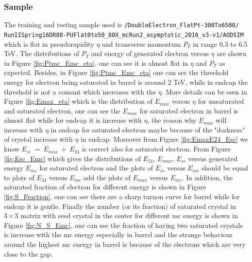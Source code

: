 \subsubsection{Sample}
The training and testing sample used is \texttt{/DoubleElectron\_FlatPt-300To6500/\\RunIISpring16DR80-PUFlat0to50\_80X\_mcRun2\_asymptotic\_2016\_v3-v1/AODSIM} \\ which is flat in pseudorapidity $\eta$ and transverse momentum $P_{T}$ in range 0.3 to 6.5 TeV. The distributions of $P_{T}$ and energy of generated electron versus $\eta$ are shown in Figure \ref{fig:Ptmc_Emc_eta}, one can see it is almost flat in $\eta$ and $P_{T}$ as expected. Besides, in Figure \ref{fig:Ptmc_Emc_eta} one can see the threshold energy for electron being saturated in barrel is around 2 TeV, while in endcap the threshold is not a consant which increases with the $\eta$. More details can be seen in Figure \ref{fig:Emax_eta} which is the distribution of $E_{max}$ versus $\eta$ for unsaturated and saturated electron, one can see the $E_{max}$ for saturated electron in barrel is almost flat while for endcap it is increase with $\eta$, the reason why $E_{max}$ will increase with $\eta$ in endcap for saturated electron maybe because of the "darkness" of crystal increase with $\eta$ in endcap.
Moreover from Figure \ref{fig:EmaxE24_Esc} we know $E_{sc}~ = ~E_{max}~+~E_{24}$ is correct also for saturated electron. From Figure \ref{fig:Esc_Emc} which gives the distributions of $E_{24}$, $E_{max}$, $E_{sc}$ versus generated energy $E_{mc}$ for saturated electron and the plots of $E_{sc}$ versus $E_{mc}$ should be equal to plots of $E_{24}$ versus $E_{mc}$ add the plots of $E_{max}$ versus $E_{mc}$. In addition, the saturated fraction of electron for different energy is shown in Figure \ref{fig:S_Fraction}, one can see there are a sharp turnon curve for barrel while for endcap it is gentle. Finally the number (or its fraction) of saturated crystal in $3\times3$ matrix with seed crystal in the center for different mc energy is shown in Figure \ref{fig:N_S_Emc}, one can see the fraction of having two saturated crystals is increase with the mc energy especially in barrel and the strange behaviour around the highest mc energy in barrel is because of the electrons which are very close to the gap.

